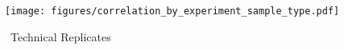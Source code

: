 \documentclass{article}
\newcommand{\beginsupplement}{%
        \setcounter{table}{0}
        \renewcommand{\thetable}{S\arabic{table}}%
        \setcounter{figure}{0}
        \renewcommand{\thefigure}{S\arabic{figure}}%
     }
\begin{document}
\begin{figure}[h!!!!]
\centering
\texttt{[image: figures/correlation\_by\_experiment\_sample\_type.pdf]}
\caption{ \
Technical Replicates
}
\label{fig:tech_reps}
\end{figure}




\end{document}
